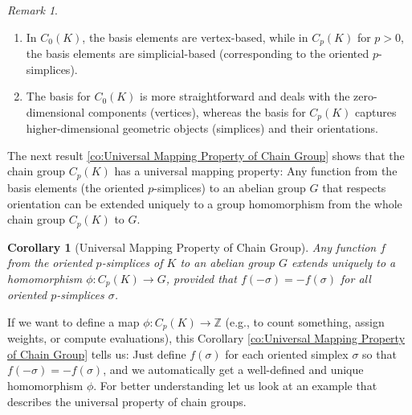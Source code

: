 \documentclass[12pt,oneside,reqno]{amsart}
\theoremstyle{plain}
\newtheorem{corollary}[theorem]{Corollary}
\theoremstyle{definition}
\theoremstyle{remark}
\newtheorem{remark}[theorem]{Remark}
\newcommand{\0}{{\textbf{0}}}
\begin{document}
\begin{remark} \hfill
\begin{enumerate}
\item In $C_0(K)$, the basis elements are vertex-based, while in $C_p(K)$ for $p > 0$, the basis elements are simplicial-based (corresponding to the oriented $p$-simplices).

\item The basis for $C_0(K)$ is more straightforward and deals with the zero-dimensional components (vertices), whereas the basis for $C_p(K)$ captures higher-dimensional geometric objects (simplices) and their orientations.
\end{enumerate}
\end{remark}



The next result \eqref{co:Universal Mapping Property of Chain Group} shows that the chain group $C_p(K)$ has a universal mapping property: Any function from the basis elements (the oriented $p$-simplices) to an abelian group $G$ that respects orientation can be extended uniquely to a group homomorphism from the whole chain group $C_p(K)$ to $G$.
\begin{corollary}[Universal Mapping Property of Chain Group]\label{co:Universal Mapping Property of Chain Group}
Any function $f$ from the oriented $p$-simplices of $K$ to an abelian group $G$ extends uniquely to a homomorphism $\phi \colon C_{p}(K) \to G$, provided that $f(-\sigma) = -f(\sigma)$ for all oriented $p$-simplices $\sigma$. 
\end{corollary}

If we want to define a map $\phi \colon C_p(K) \to \mathbb{Z}$ (e.g., to count something, assign weights, or compute evaluations), this Corollary  \eqref{co:Universal Mapping Property of Chain Group} tells us: Just define $f(\sigma)$ for each oriented simplex $\sigma$ so that $f(-\sigma) = -f(\sigma)$, and we automatically get a well-defined and unique homomorphism $\phi$. For better understanding let us look at an example that describes the universal property of chain groups. 
\end{document}
